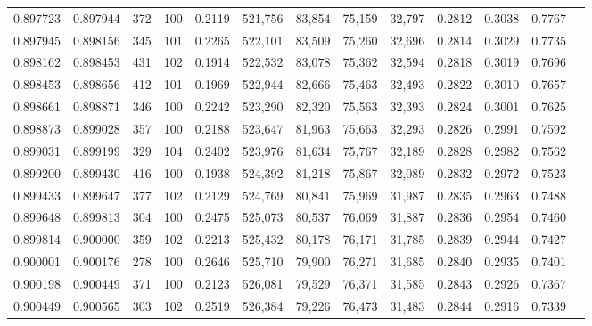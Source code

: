 \begin{tabular}{rrrrrrrrrrrrr}
0.897723 & 0.897944 &   372 & 100 &                                     0.2119 & 521,756 &  83,854 &  75,159 &  32,797 & 0.2812 & 0.3038 & 0.7767 \\
0.897945 & 0.898156 &   345 & 101 &                                     0.2265 & 522,101 &  83,509 &  75,260 &  32,696 & 0.2814 & 0.3029 & 0.7735 \\
0.898162 & 0.898453 &   431 & 102 &                                     0.1914 & 522,532 &  83,078 &  75,362 &  32,594 & 0.2818 & 0.3019 & 0.7696 \\
0.898453 & 0.898656 &   412 & 101 &                                     0.1969 & 522,944 &  82,666 &  75,463 &  32,493 & 0.2822 & 0.3010 & 0.7657 \\
0.898661 & 0.898871 &   346 & 100 &                                     0.2242 & 523,290 &  82,320 &  75,563 &  32,393 & 0.2824 & 0.3001 & 0.7625 \\
0.898873 & 0.899028 &   357 & 100 &                                     0.2188 & 523,647 &  81,963 &  75,663 &  32,293 & 0.2826 & 0.2991 & 0.7592 \\
0.899031 & 0.899199 &   329 & 104 &                                     0.2402 & 523,976 &  81,634 &  75,767 &  32,189 & 0.2828 & 0.2982 & 0.7562 \\
0.899200 & 0.899430 &   416 & 100 &                                     0.1938 & 524,392 &  81,218 &  75,867 &  32,089 & 0.2832 & 0.2972 & 0.7523 \\
0.899433 & 0.899647 &   377 & 102 &                                     0.2129 & 524,769 &  80,841 &  75,969 &  31,987 & 0.2835 & 0.2963 & 0.7488 \\
0.899648 & 0.899813 &   304 & 100 &                                     0.2475 & 525,073 &  80,537 &  76,069 &  31,887 & 0.2836 & 0.2954 & 0.7460 \\
0.899814 & 0.900000 &   359 & 102 &                                     0.2213 & 525,432 &  80,178 &  76,171 &  31,785 & 0.2839 & 0.2944 & 0.7427 \\
0.900001 & 0.900176 &   278 & 100 &                                     0.2646 & 525,710 &  79,900 &  76,271 &  31,685 & 0.2840 & 0.2935 & 0.7401 \\
0.900198 & 0.900449 &   371 & 100 &                                     0.2123 & 526,081 &  79,529 &  76,371 &  31,585 & 0.2843 & 0.2926 & 0.7367 \\
0.900449 & 0.900565 &   303 & 102 &                                     0.2519 & 526,384 &  79,226 &  76,473 &  31,483 & 0.2844 & 0.2916 & 0.7339 \\

\end{tabular}
